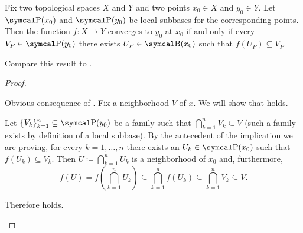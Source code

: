 \begin{proposition}\label{thm:cauchy_function_convergence_via_subbases}
  Fix two topological spaces \( X \) and \( Y \) and two points \( x_0 \in X \) and \( y_0 \in Y \). Let \( \CP(x_0) \) and \( \CP(y_0) \) be local \hyperref[def:topological_local_subbase]{subbases} for the corresponding points. Then the function \( f: X \to Y \) \hyperref[def:local_convergence]{converges} to \( y_0 \) at \( x_0 \) if and only if every \( V_P \in \CP(y_0) \) there exists \( U_P \in \CB(x_0) \) such that \( f(U_P) \subseteq V_P \).

  Compare this result to .
\end{proposition}
\begin{proof}\mbox{}
  \begin{description}
    \Implies Obvious consequence of .
    \ImpliedBy Fix a neighborhood \( V \) of \( x \). We will show that  holds.

    Let \( \{ V_k \}_{k=1}^n \subseteq \CP(y_0) \) be a family such that \( \bigcap_{k=1}^n V_k \subseteq V \) (such a family exists by definition of a local subbase). By the antecedent of the implication we are proving, for every \( k = 1, \ldots, n \) there exists an \( U_k \in \CP(x_0) \) such that \( f(U_k) \subseteq V_k \). Then \( U \coloneqq \bigcap_{k=1}^n U_k \) is a neighborhood of \( x_0 \) and, furthermore,
    \begin{equation*}
      f(U)
      =
      f\left(\bigcap_{k=1}^n U_k \right)
      \subseteq
      \bigcap_{k=1}^n f(U_k)
      \subseteq
      \bigcap_{k=1}^n V_k
      \subseteq
      V.
    \end{equation*}

    Therefore  holds.
  \end{description}
\end{proof}
